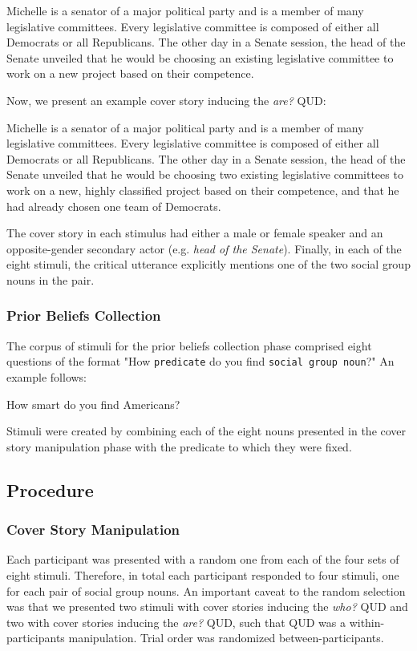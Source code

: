 \documentclass[11pt,a4paper]{article}
\begin{document}
\begin{exe}
\ex\label{string} {Michelle is a senator of a major political party and is a member of many legislative committees. Every legislative committee is composed of either all Democrats or all Republicans. The other day in a Senate session, the head of the Senate unveiled that he would be choosing an existing legislative committee to work on a new project based on their competence.}
\end{exe}

Now, we present an example cover story inducing the \textit{are?} QUD: 

\begin{exe}
\ex\label{string} {Michelle is a senator of a major political party and is a member of many legislative committees. Every legislative committee is composed of either all Democrats or all Republicans. The other day in a Senate session, the head of the Senate unveiled that he would be choosing two existing legislative committees to work on a new, highly classified project based on their competence, and that he had already chosen one team of Democrats.}
\end{exe}

The cover story in each stimulus had either a male or female speaker and an opposite-gender secondary actor (e.g. \textit{head of the Senate}). Finally, in each of the eight stimuli, the critical utterance explicitly mentions one of the two social group nouns in the pair. 

\subsubsection{Prior Beliefs Collection}

The corpus of stimuli for the prior beliefs collection phase comprised eight questions of the format "How \texttt{predicate} do you find \texttt{social group noun}?" An example follows: 

\begin{exe}
\ex\label{string} {How smart do you find Americans?}
\end{exe}

Stimuli were created by combining each of the eight nouns presented in the cover story manipulation phase with the predicate to which they were fixed.

\subsection{Procedure}
\subsubsection{Cover Story Manipulation}
Each participant was presented with a random one from each of the four sets of eight stimuli. Therefore, in total each participant responded to four stimuli, one for each pair of social group nouns. An important caveat to the random selection was that we presented two stimuli with cover stories inducing the \textit{who?} QUD and two with cover stories inducing the \textit{are?} QUD, such that QUD was a within-participants manipulation. Trial order was randomized between-participants. 
\end{document}
